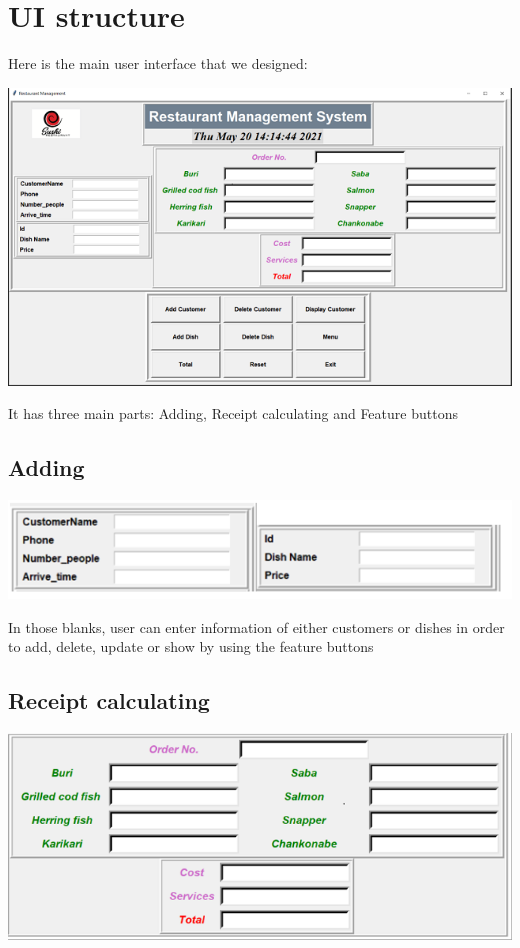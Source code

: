 \newpage
\section{UI structure}
\hspace{0.7cm} Here is the main user interface that we designed:

\vspace{1cm}
\includegraphics{images/UI structure.png}

It has three main parts: Adding, Receipt calculating and Feature buttons

\vspace{0.5cm}
\subsection{Adding}
\includegraphics{images/adding.png}

\hspace{0.7cm}
In those blanks, user can enter information of either customers or dishes in order to add, delete, update or show by using the feature buttons

\newpage
\subsection{Receipt calculating}
\vspace{1cm}
\includegraphics{images/ordering.png}

